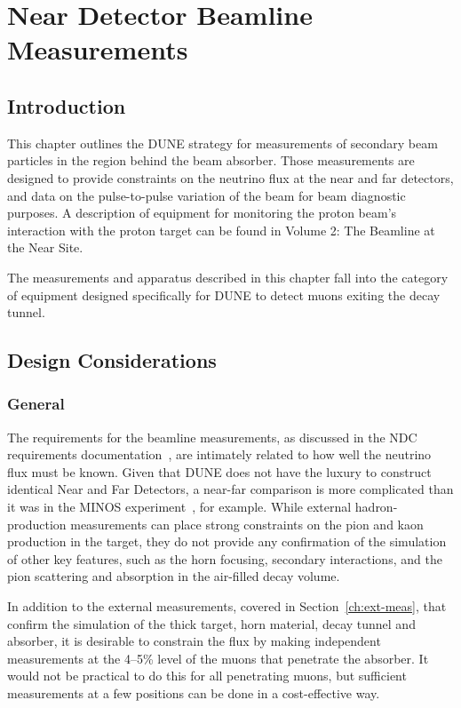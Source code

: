 \chapter{Near Detector Beamline Measurements}
\label{ch:nd-blm}


\section{Introduction}
\label{sec:nd-blm-intro}

This chapter outlines the DUNE strategy for measurements of secondary
beam particles in the region behind the beam absorber. 
Those measurements are designed to provide constraints 
on the neutrino flux at the near and far
detectors, and data on the pulse-to-pulse variation
of the beam for beam diagnostic purposes. A description of equipment
for monitoring the proton beam's interaction with the proton target
can be found in Volume 2: The Beamline at the Near Site. 

The measurements and apparatus described in this chapter fall into
the category of equipment designed specifically for DUNE to
detect muons exiting the decay tunnel. 

\section{Design Considerations}
\label{sec:nd-blm-design}

\subsection{General}
The requirements for the beamline measurements, 
as discussed in the NDC requirements documentation~\cite{nd_requirements_doc}, 
are intimately related to how well the neutrino flux must be known. 
Given that DUNE does not have the luxury to construct identical 
Near and Far Detectors, a near-far comparison is more complicated than it was in
the MINOS experiment~\cite{gnumi-validation}, for example.   
While external hadron-production measurements can place strong 
constraints on the pion and kaon production in the target, they do not 
provide any confirmation of the simulation of other key features, such 
as the horn focusing, secondary interactions, and the 
pion scattering and absorption in the air-filled decay volume. 

In addition to the external measurements, covered in Section~\ref{ch:ext-meas}, 
that confirm the simulation of the thick target, horn material, decay tunnel and
absorber, it is desirable to constrain the flux by making independent
measurements at the 4--5\% level of the muons that penetrate the absorber. It would not be practical to do this for all penetrating muons, but sufficient measurements at a few positions can be done in a  cost-effective way. 

